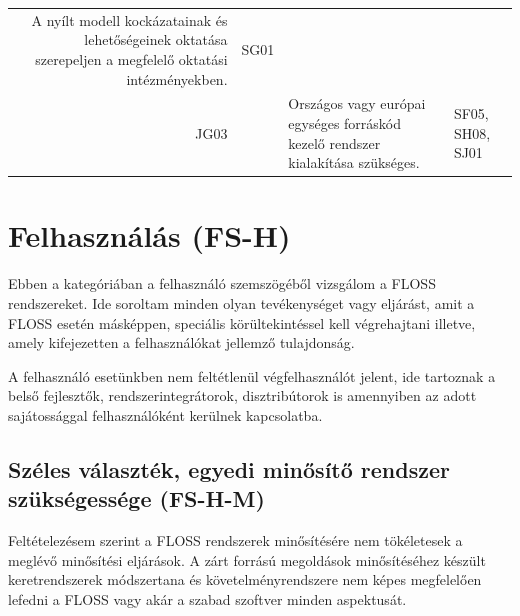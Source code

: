 \documentclass[12pt,magyar,a4paper,oneside]{scrreprt}
\begin{document}
\begin{longtable}[]{@{}rcll@{}}
\begin{minipage}[t]{0.69\columnwidth}
A nyílt modell kockázatainak és lehetőségeinek oktatása szerepeljen a
megfelelő oktatási intézményekben.\strut
\end{minipage} & \begin{minipage}[t]{0.13\columnwidth}\raggedright
SG01\strut
\end{minipage}\tabularnewline
\begin{minipage}[t]{0.03\columnwidth}\raggedleft
JG03\strut
\end{minipage} & \begin{minipage}[t]{0.03\columnwidth}\centering
3\strut
\end{minipage} & \begin{minipage}[t]{0.69\columnwidth}\raggedright
Országos vagy európai egységes forráskód kezelő rendszer kialakítása
szükséges.\strut
\end{minipage} & \begin{minipage}[t]{0.13\columnwidth}\raggedright
SF05, SH08, SJ01\strut
\end{minipage}\tabularnewline
\bottomrule
\end{longtable}

\hypertarget{sec:Usage}{%
\section{Felhasználás (FS-H)}\label{sec:Usage}}

Ebben a kategóriában a felhasználó szemszögéből vizsgálom a FLOSS
rendszereket. Ide soroltam minden olyan tevékenységet vagy eljárást,
amit a FLOSS esetén másképpen, speciális körültekintéssel kell
végrehajtani illetve, amely kifejezetten a felhasználókat jellemző
tulajdonság.

A felhasználó esetünkben nem feltétlenül végfelhasználót jelent, ide
tartoznak a belső fejlesztők, rendszerintegrátorok, disztribútorok is
amennyiben az adott sajátossággal felhasználóként kerülnek kapcsolatba.

\hypertarget{sec:FS-H-M}{%
\subsection{Széles választék, egyedi minősítő rendszer szükségessége
(FS-H-M)}\label{sec:FS-H-M}}

Feltételezésem szerint a FLOSS rendszerek minősítésére nem tökéletesek a
meglévő minősítési eljárások. A zárt forrású megoldások minősítéséhez
készült keretrendszerek módszertana és követelményrendszere nem képes
megfelelően lefedni a FLOSS vagy akár a szabad szoftver minden
aspektusát.
\end{document}
